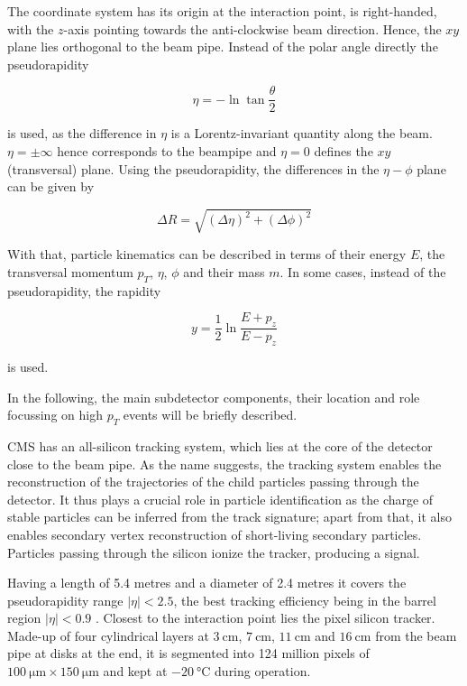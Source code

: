 The coordinate system has its origin at the interaction point, is right-handed, with the $z$-axis pointing towards the anti-clockwise beam direction. Hence, the $xy$ plane lies orthogonal to the beam pipe. Instead of the polar angle directly the pseudorapidity 

\begin{equation*}
	\eta = -\ln\tan\frac{\theta}{2}
\end{equation*}

is used, as the difference in $\eta$ is a Lorentz-invariant quantity along the beam. $\eta = \pm\infty$ hence corresponds to the beampipe and $\eta = 0$ defines the $xy$ (transversal) plane. Using the pseudorapidity, the differences in the $\eta-\phi$ plane can be given by

\begin{equation*}
	\Delta R = \sqrt{\left(\Delta\eta\right)^2 + \left(\Delta\phi\right)^2}
\end{equation*}

With that, particle kinematics can be described in terms of their energy $E$, the transversal momentum $p_T$, $\eta$, $\phi$ and their mass $m$. In some cases, instead of the pseudorapidity, the rapidity

\begin{equation*}
	y = \frac{1}{2}\ln\frac{E+p_z}{E-p_z}
\end{equation*}

is used.

In the following, the main subdetector components, their location and role focussing on high $p_T$ events will be briefly described.


CMS has an all-silicon tracking system, which lies at the core of the detector close to the beam pipe. As the name suggests, the tracking system enables the reconstruction of the trajectories of the child particles passing through the detector. It thus plays a crucial role in particle identification as the charge of stable particles can be inferred from the track signature; apart from that, it also enables secondary vertex reconstruction of short-living secondary particles. Particles passing through the silicon ionize the tracker, producing a signal.

Having a length of 5.4 metres and a diameter of 2.4 metres it covers the pseudorapidity range $|\eta|<2.5$, the best tracking efficiency being in the barrel region $|\eta| < 0.9$ \cite{Veszpremi_2014}. Closest to the interaction point lies the pixel silicon tracker. Made-up of four cylindrical layers at $\SI{3}{\centi\meter}$, $\SI{7}{\centi\meter}$, $\SI{11}{\centi\meter}$ and $\SI{16}{\centi\meter}$ from the beam pipe at disks at the end, it is segmented into 124 million pixels of $\SI{100}{\micro\meter} \times \SI{150}{\micro\meter}$ and kept at $\SI{-20}{\degreeCelsius}$ during operation.

